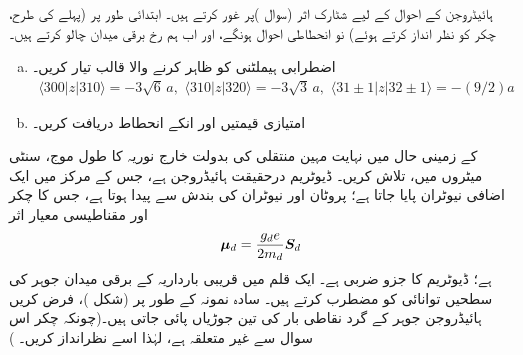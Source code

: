  ہائیڈروجن کے  احوال کے لیے شٹارک اثر (سوال )پر غور کرتے ہیں۔ ابتدائی طور پر (پہلے کی طرح، چکر کو نظر انداز کرتے ہوئے) نو انحطاطی احوال 
 ہونگے، اور اب ہم  رخ برقی میدان چالو کرتے ہیں۔
\begin{enumerate}[a.]
\item
اضطرابی ہیملٹنی کو ظاہر کرنے والا  قالب تیار کریں۔ 
\begin{align*}
\langle 300|z|310\rangle =-3\sqrt{6}\,a,\,\,\langle 310|z|320\rangle =-3\sqrt{3}\,a,\,\,\langle 31\pm1|z|32\pm1\rangle=-(9/2)a
\end{align*}
\item 
امتیازی قیمتیں اور انکے انحطاط دریافت کریں۔ 
\end{enumerate}
 کے زمینی حال  میں نہایت مہین منتقلی کی بدولت خارج نوریہ کا طول موج، سنٹی میٹروں میں، تلاش کریں۔ ڈیوٹریم درحقیقت  ہائیڈروجن ہے، جس کے مرکز میں ایک اضافی نیوٹران پایا جاتا ہے؛ پروٹان اور نیوٹران کی بندش سے  پیدا ہوتا ہے، جس کا چکر  اور مقناطیسی معیار اثر
\begin{align*}
{\ensuremath{{\boldsymbol{\mu}}}}_{d}=\frac{g_{d}e}{2m_{d}}{{\boldsymbol{S}}}_{d}
\end{align*}
ہے؛ ڈیوٹریم کا  جزو ضربی  ہے۔
 ایک قلم میں قریبی بارداریہ کے برقی میدان جوہر کی سطحیں توانائی کو مضطرب کرتے ہیں۔ سادہ نمونہ کے طور پر (شکل )، فرض کریں ہائیڈروجن جوہر کے گرد نقاطی بار کی تین جوڑیاں پائی جاتی ہیں۔(چونکہ چکر اس سوال سے غیر متعلقہ ہے، لہٰذا اسے نظرانداز کریں۔ )
 
